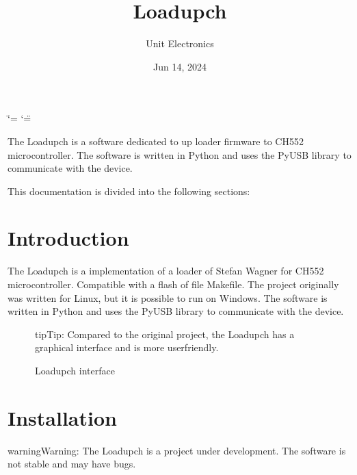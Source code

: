 \documentclass[letterpaper,10pt,english]{sphinxmanual}
\title{Loadupch}
\date{Jun 14, 2024}
\author{Unit Electronics}
\begin{document}
\ifdefined\shorthandoff
  \ifnum\catcode`\=\string=\active\shorthandoff{=}\fi
  \ifnum\catcode`\"=\active{}\fi
\fi

\pagestyle{empty}
\sphinxmaketitle
\pagestyle{plain}
\sphinxtableofcontents
\pagestyle{normal}
\label{\detokenize{index::doc}}


\sphinxAtStartPar
The Loadupch is a software dedicated to up loader firmware to CH552 microcontroller. The software
is written in Python and uses the PyUSB library to communicate with the device.

\sphinxAtStartPar
This documentation is divided into the following sections:

\sphinxstepscope


\chapter{Introduction}
\label{\detokenize{about:introduction}}\label{\detokenize{about::doc}}
\sphinxAtStartPar
The Loadupch is a implementation of a loader of Stefan Wagner for CH552 microcontroller.
Compatible with a flash  of file Makefile. The project originally was written for Linux,
but it is possible to run on Windows.
The software is written in Python and uses the PyUSB library to communicate with the device.

\begin{figure}[htbp]
\centering
\capstart

\noindent{}
\caption{Loadupch interface}\label{\detokenize{about:id1}}
\begin{sphinxlegend}
\begin{sphinxadmonition}{tip}{Tip:}
\sphinxAtStartPar
Compared to the original project, the Loadupch has a graphical interface and is more user\sphinxhyphen{}friendly.
\end{sphinxadmonition}
\end{sphinxlegend}
\end{figure}

\sphinxstepscope


\chapter{Installation}
\label{\detokenize{installation:installation}}\label{\detokenize{installation::doc}}
\begin{sphinxadmonition}{warning}{Warning:}
\sphinxAtStartPar
The Loadupch is a project under development. The software is not stable and may have bugs.
\end{sphinxadmonition}
\end{document}
